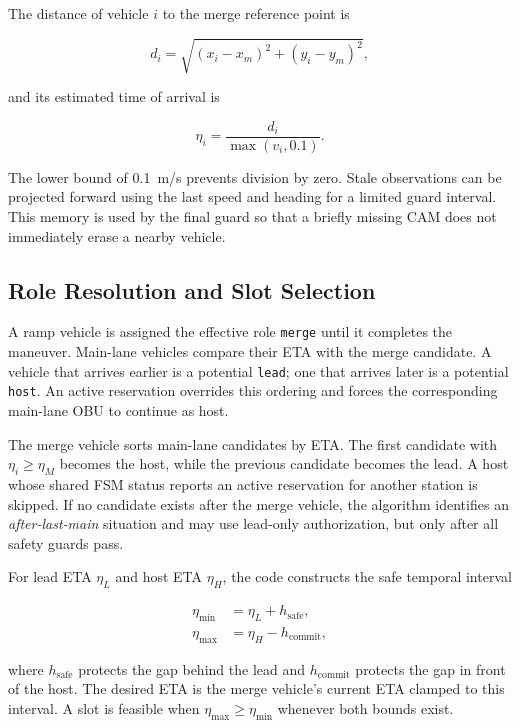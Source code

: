 \documentclass[a4paper,12pt]{article}
\begin{document}
The distance of vehicle $i$ to the merge reference point is

\begin{equation}
    d_i = \sqrt{(x_i-x_m)^2 + (y_i-y_m)^2},
    \label{eq:distance}
\end{equation}

and its estimated time of arrival is

\begin{equation}
    \eta_i = \frac{d_i}{\max(v_i,0.1)}.
    \label{eq:eta}
\end{equation}

The lower bound of \SI{0.1}{m/s} prevents division by zero. Stale observations can be projected forward using the last speed and heading for a limited guard interval. This memory is used by the final guard so that a briefly missing CAM does not immediately erase a nearby vehicle.

\subsection{Role Resolution and Slot Selection}

A ramp vehicle is assigned the effective role \texttt{merge} until it completes the maneuver. Main-lane vehicles compare their ETA with the merge candidate. A vehicle that arrives earlier is a potential \texttt{lead}; one that arrives later is a potential \texttt{host}. An active reservation overrides this ordering and forces the corresponding main-lane OBU to continue as host.

The merge vehicle sorts main-lane candidates by ETA. The first candidate with $\eta_i \geq \eta_M$ becomes the host, while the previous candidate becomes the lead. A host whose shared FSM status reports an active reservation for another station is skipped. If no candidate exists after the merge vehicle, the algorithm identifies an \emph{after-last-main} situation and may use lead-only authorization, but only after all safety guards pass.

For lead ETA $\eta_L$ and host ETA $\eta_H$, the code constructs the safe temporal interval

\begin{align}
    \eta_{\min} &= \eta_L + h_{\mathrm{safe}}, \\
    \eta_{\max} &= \eta_H - h_{\mathrm{commit}},
    \label{eq:window}
\end{align}

where $h_{\mathrm{safe}}$ protects the gap behind the lead and $h_{\mathrm{commit}}$ protects the gap in front of the host. The desired ETA is the merge vehicle's current ETA clamped to this interval. A slot is feasible when $\eta_{\max} \geq \eta_{\min}$ whenever both bounds exist.
\end{document}

